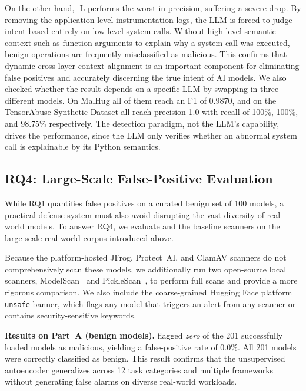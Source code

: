 On the other hand, \toolname{}-L performs the worst in precision, suffering a severe drop. By removing the application-level instrumentation logs, the LLM is forced to judge intent based entirely on low-level system calls. Without high-level semantic context such as function arguments to explain why a system call was executed, benign operations are frequently misclassified as malicious. This confirms that dynamic cross-layer context alignment is an important component for eliminating false positives and accurately discerning the true intent of AI models. We also checked whether the result depends on a specific LLM by swapping in three different models. On MalHug all of them reach an F1 of 0.9870, and on the TensorAbuse Synthetic Dataset all reach precision 1.0 with recall of 100\%, 100\%, and 98.75\% respectively. The detection paradigm, not the LLM's capability, drives the performance, since the LLM only verifies whether an abnormal system call is explainable by its Python semantics.


\label{sec:rq4}
\subsection{RQ4: Large-Scale False-Positive Evaluation}

While RQ1 quantifies false positives on a curated benign set of 100 models, a practical defense system must also avoid disrupting the vast diversity of real-world models. To answer RQ4, we evaluate \toolname{} and the baseline scanners on the large-scale real-world corpus introduced above. 

Because the platform-hosted JFrog, Protect~AI, and ClamAV scanners do not comprehensively scan these models, we additionally run two open-source local scanners, ModelScan~\cite{modelscan} and PickleScan~\cite{picklescanning}, to perform full scans and provide a more rigorous comparison. We also include the coarse-grained Hugging Face platform \texttt{unsafe} banner, which flags any model that triggers an alert from any scanner or contains security-sensitive keywords.

\noindent \textbf{Results on Part~A (benign models).} \toolname{} flagged \emph{zero} of the 201 successfully loaded models as malicious, yielding a false-positive rate of 0.0\%. All 201 models were correctly classified as benign. This result confirms that the unsupervised autoencoder generalizes across 12 task categories and multiple frameworks without generating false alarms on diverse real-world workloads.

